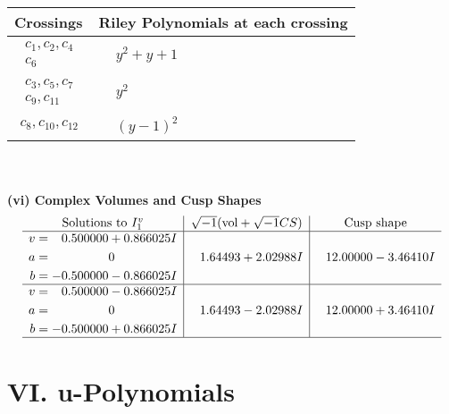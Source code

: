 \documentclass[1p]{elsarticle_modified}
\theoremstyle{definition}
\newcommand{\I}{\sqrt{-1}}
\begin{document}
\begin{tabular}{m{50pt}|m{274pt}}
Crossings & \hspace{64pt}Riley Polynomials at each crossing \\
\hline $$\begin{aligned}c_{1},c_{2},c_{4}\\c_{6}\end{aligned}$$&$\begin{aligned}
&y^2+y+1
\end{aligned}$\\
\hline $$\begin{aligned}c_{3},c_{5},c_{7}\\c_{9},c_{11}\end{aligned}$$&$\begin{aligned}
&y^2
\end{aligned}$\\
\hline $$\begin{aligned}c_{8},c_{10},c_{12}\end{aligned}$$&$\begin{aligned}
&(y-1)^2
\end{aligned}$\\
\hline
\end{tabular}\\~\\
\newpage\flushleft \textbf{(vi) Complex Volumes and Cusp Shapes}
$$\begin{array}{c|c|c}  
\text{Solutions to }I^v_{1}& \I (\text{vol} + \sqrt{-1}CS) & \text{Cusp shape}\\
 \hline 
\begin{aligned}
v &= \phantom{-}0.500000 + 0.866025 I \\
a &= \phantom{-0.000000 } 0 \\
b &= -0.500000 - 0.866025 I\end{aligned}
 & \phantom{-}1.64493 + 2.02988 I & \phantom{-}12.00000 - 3.46410 I \\ \hline\begin{aligned}
v &= \phantom{-}0.500000 - 0.866025 I \\
a &= \phantom{-0.000000 } 0 \\
b &= -0.500000 + 0.866025 I\end{aligned}
 & \phantom{-}1.64493 - 2.02988 I & \phantom{-}12.00000 + 3.46410 I\\
 \hline 
 \end{array}$$\newpage
\newpage\renewcommand{\arraystretch}{1}
\centering \section*{ VI. u-Polynomials}
\end{document}
